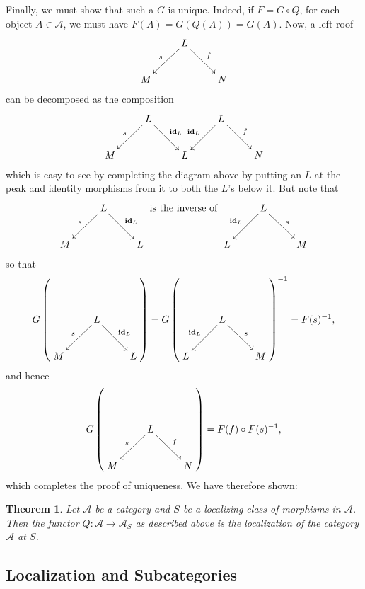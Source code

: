\documentclass[11pt]{article}
\theoremstyle{thmstyle}
\newtheorem{theorem}{Theorem}[section]
\theoremstyle{defstyle}
\newcommand{\id}{\mathbf{id}}
\newcommand{\scrA}{\mathscr{A}}
\begin{document}
Finally, we must show that such a $G$ is unique. Indeed, if $F = G\circ Q$, for each object $A\in\scrA$, we must have $F(A) = G(Q(A)) = G(A)$. Now, a left roof 
\begin{equation*}
	\xymatrix { 
		& L\ar[ld]_s\ar[rd]^f & \\
		M & & N
	}
\end{equation*}
can be decomposed as the composition 
\begin{equation*}
	\xymatrix {
		& L\ar[ld]_s\ar[rd]^{\id_L} & & L\ar[ld]_{\id_L}\ar[rd]^f & \\
		M & & L & & N
	}
\end{equation*}
which is easy to see by completing the diagram above by putting an $L$ at the peak and identity morphisms from it to both the $L$'s below it. But note that 
\begin{equation*}
	\xymatrix {
		& L\ar[ld]_{s}\ar[rd]^{\id_L} & \\
		M & & L
	}\text{ is the inverse of }
	\xymatrix {
		& L\ar[ld]_{\id_L}\ar[rd]^s & \\
		L && M
	}
\end{equation*}
so that 
\begin{equation*}
	G\left(
		\xymatrix {
			& L\ar[ld]_{s}\ar[rd]^{\id_L} & \\
			M & & L
		}
	\right) = 
	G\left(
		\xymatrix {
			& L\ar[ld]_{\id_L}\ar[rd]^s & \\
			L && M
		}
	\right)^{-1} = F(s)^{-1},
\end{equation*}
and hence 
\begin{equation*}
	G\left(\xymatrix{
		& L\ar[ld]_s\ar[rd]^f & \\
		M & & N
	}\right) = F(f)\circ F(s)^{-1},
\end{equation*}
which completes the proof of uniqueness. We have therefore shown: 
\begin{theorem}
	Let $\scrA$ be a category and $S$ be a localizing class of morphisms in $\scrA$. Then the functor $Q\colon\scrA\to\scrA_S$ as described above is the localization of the category $\scrA$ at $S$.
\end{theorem}

\subsection{Localization and Subcategories}
\end{document}
